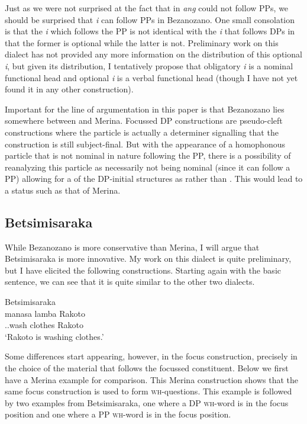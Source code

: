 \documentclass[output=paper]{langsci/langscibook}
\begin{document}
Just as we were not surprised at the fact that in  \emph{ang} could not
follow PPs, we should be surprised that \emph{i} can follow PPs in Bezanozano.
One small consolation is that the \emph{i} which follows the PP is not
identical with the \emph{i} that follows DPs in that the former is optional
while the latter is not.  Preliminary work on this dialect has not provided any
more information on the distribution of this optional \emph{i}, but given its
distribution, I tentatively propose that obligatory \emph{i} is a nominal
functional head and optional \emph{i} is a verbal functional head (though I
have not yet found it in any other construction).

Important for the line of argumentation in this paper is that Bezanozano lies
somewhere between  and Merina.  Focussed DP constructions are
pseudo-cleft constructions where the particle is actually a determiner
signalling that the construction is still subject-final.  But with the
appearance of a homophonous particle that is not nominal in nature following
the PP, there is a possibility of reanalyzing this particle as necessarily not
being nominal (since it can follow a PP) allowing for a  of the DP-initial structures as  rather than . This would lead to a
status such as that of Merina.

\subsection{Betsimisaraka}

While Bezanozano is more conservative than Merina, I will argue that
Betsimisaraka is more innovative.  My work on this dialect is quite
preliminary, but I have elicited the following constructions.  Starting again
with the basic sentence, we can see that it is quite similar to the other two
dialects.\newpage

\ea Betsimisaraka\\
	\gll  manasa lamba Rakoto\\
     \Prs.\At{}.wash clothes Rakoto\\
    \glt `Rakoto is washing clothes.'
\z

Some differences start appearing, however, in the focus construction,
precisely in the choice of the material that follows the focussed constituent.
Below we first have a Merina example for comparison.  This Merina construction
shows that the same focus construction is used to form
\textsc{wh-}questions.  This example is followed by two examples from
Betsimisaraka, one where a DP \textsc{wh}-word is in the focus position and one
where a PP \textsc{wh}-word is in the focus position.
\end{document}
